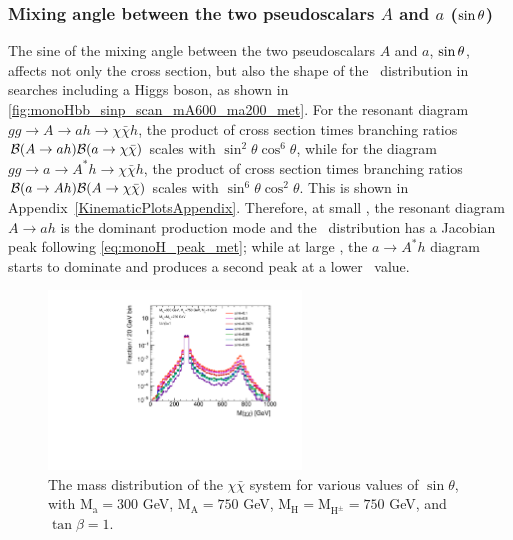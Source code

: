\subsubsection{Mixing angle between the two pseudoscalars $A$ and $a$ ($\sin\theta$)}

The sine of the mixing angle between the two pseudoscalars $A$ and $a$, $\sin\theta$, affects not only the cross section, but also the shape of the \MET\ distribution in searches including a Higgs boson, as shown in \autoref{fig:monoHbb_sinp_scan_mA600_ma200_met}. 
For the resonant diagram $gg\rightarrow A \rightarrow ah \rightarrow \chi\bar{\chi}h$, the product of cross section times branching ratios ${\cal B}(A\rightarrow ah){\cal B}(a \rightarrow \chi\bar{\chi})$ scales with $\sin^2\theta\cos^6\theta$, while for the diagram $gg\rightarrow a \rightarrow A^*h \rightarrow \chi\bar{\chi}h$, the product of cross section times branching ratios ${\cal B}(a\rightarrow Ah){\cal B}(A \rightarrow \chi\bar{\chi})$ scales with $\sin^6\theta\cos^2\theta$. 
This is shown in Appendix~\autoref{KinematicPlotsAppendix}.
Therefore, at small \sinp, the resonant diagram $A\rightarrow ah$ is the dominant production mode and the \MET\ distribution has a Jacobian peak following \autoref{eq:monoH_peak_met}; while at large \sinp, the $a\rightarrow A^*h$ diagram starts to dominate and produces a second peak at a lower \MET\ value. 

\begin{figure}
  \centering
  \includegraphics[width=0.6\textwidth]{texinputs/04_grid/figures/DMHF/benchmarking/MDM_1_Ma_300_MA_750_tanb_1.0_SCAN_sinp_v2/mchichi.pdf}
  \caption{The mass distribution of the $\chi \bar{\chi}$ system for various values of $\sin\theta$, with $\mathrm{M_a}=300$ GeV, $\mathrm{M_A}=750$ GeV, $\mathrm{M_H}=\mathrm{M_{H^{\pm}}}=750$ GeV, and $\tan\beta=1$.}
  \label{fig:mchichi_sinp}
\end{figure} 

